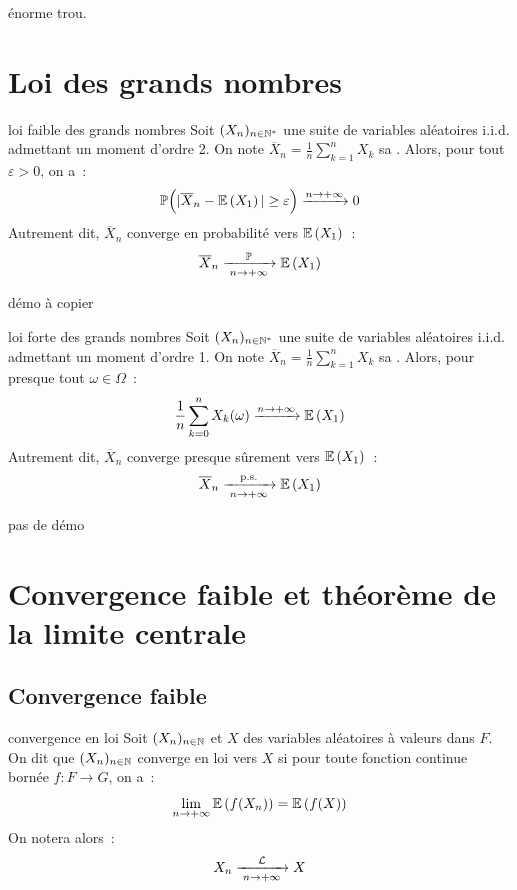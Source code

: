 énorme trou.

\section{Loi des grands nombres}

\begin{theoreme}{}{loi faible des grands nombres}
    Soit $(X_n)_{n\in \mathbb{N}^*}$ une suite de variables aléatoires i.i.d. admettant un moment d'ordre 2. On note $\overline{X}_n = \frac{1}{n}\sum_{k=1}^n X_k$ sa . Alors, pour tout $\varepsilon > 0$, on a~:
    $$\mathbb{P}\Big( \vert \overline{X}_n - \mathbb{E}\left(X_1\right) \vert \geq \varepsilon\Big) \xrightarrow{n \to +\infty} 0$$
    Autrement dit, $\overline{X}_n$ converge en probabilité vers $\mathbb{E}\left(X_1\right)$~:
    $$\overline{X}_n \xrightarrow[\;n \to +\infty\;]{\mathbb{P}} \mathbb{E}\left(X_1\right)$$
    
\end{theoreme}

démo à copier


\begin{theoreme}{}{loi forte des grands nombres}
    Soit $(X_n)_{n\in \mathbb{N}^*}$ une suite de variables aléatoires i.i.d. admettant un moment d'ordre 1. On note $\overline{X}_n = \frac{1}{n}\sum_{k=1}^n X_k$ sa . Alors, pour presque tout $\omega \in \Omega$~:
    $$\frac{1}{n} \sum_{k=0}^nX_k(\omega) \xrightarrow{n \to +\infty} \mathbb{E}\left(X_1\right)$$
    Autrement dit, $\overline{X}_n$ converge presque sûrement vers $\mathbb{E}\left(X_1\right)$~:
    $$\overline{X}_n \xrightarrow[\;n \to +\infty\;]{\mathrm{p.s.}} \mathbb{E}\left(X_1\right)$$
\end{theoreme}

pas de démo

\section{Convergence faible et théorème de la limite centrale}
\subsection{Convergence faible}

\begin{definition}{}{convergence en loi}
    Soit $(X_n)_{n \in \mathbb{N}}$ et $X$ des variables aléatoires à valeurs dans $F$. On dit que $(X_n)_{n \in \mathbb{N}}$ converge en loi vers $X$ si pour toute fonction continue bornée $f : F \to G$, on a~:
    $$\lim_{n \to +\infty} \mathbb{E}\left(f(X_n)\right) = \mathbb{E}\left(f(X)\right)$$
    On notera alors~:
    $$ X_n \xrightarrow[\;n \to +\infty\;]{\mathcal{L}} X$$
    
\end{definition}

